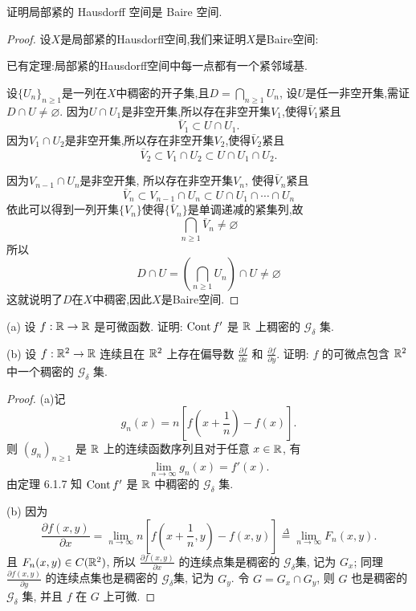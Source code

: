\begin{exercise}
    证明局部紧的 Hausdorff 空间是 Baire 空间.
\end{exercise}

\begin{proof}
  设$X$是局部紧的Hausdorff空间,我们来证明$X$是Baire空间:

  已有定理:局部紧的Hausdorff空间中每一点都有一个紧邻域基.

  设$\{U_n\}_{n\geq 1}$是一列在$X$中稠密的开子集,且$D=\bigcap_{n\geq 1}U_n$,
  设$U$是任一非空开集,需证$D\cap U\neq\varnothing$.
  因为$U\cap U_1$是非空开集,所以存在非空开集$V_1$,使得$\bar{V}_1$紧且
  \[\bar{V}_1\subset U\cap U_1.\]
  因为$V_1\cap U_2$是非空开集,所以存在非空开集$V_2$,使得$\bar{V}_2$紧且\[\bar{V}_2\subset V_1\cap U_2\subset U\cap U_1\cap U_2.\]

  因为$V_{n-1}\cap U_n$是非空开集, 所以存在非空开集$V_n$, 使得$\bar{V}_n$紧且\[\bar{V}_n\subset V_{n-1}\cap U_n\subset U\cap U_1\cap\cdots\cap U_n\]
  依此可以得到一列开集$\{V_n\}$使得$\{\bar{V}_n\}$是单调递减的紧集列,故
  \[\bigcap_{n\geq 1}\bar{V}_n\neq\varnothing\]
  所以
  \[D\cap U=\left(\bigcap_{n\geq 1}U_n\right)\cap U\neq\varnothing\]这就说明了$D$在$X$中稠密,因此$X$是Baire空间.
\end{proof}



\begin{exercise}
    (a) 设 $f:\mathbb{R}\to\mathbb{R}$ 是可微函数. 证明: $\operatorname{Cont}{f'}$ 是 $\mathbb{R}$ 上稠密的 $\mathcal{G}_{\delta}$ 集.

    (b) 设 $f:\mathbb{R}^2\to\mathbb{R}$ 连续且在 $\mathbb{R}^2$ 上存在偏导数 $\frac{\partial f}{\partial x}$ 和 $\frac{\partial f}{\partial y}$.
    证明: $f$ 的可微点包含 $\mathbb{R}^2$ 中一个稠密的 $\mathcal{G}_{\delta}$ 集.
\end{exercise}

\begin{proof}
    (a)记
    \[g_n(x)=n\left[f\left(x+\frac{1}{n}\right)-f(x)\right].\]
    则 $(g_n)_{n\geq 1}$ 是 $\mathbb{R}$ 上的连续函数序列且对于任意 $x\in\mathbb{R}$, 有
    \[\lim_{n\to\infty}g_n(x)=f'(x).\]
    由定理 6.1.7 知 $\operatorname{Cont}{f'}$ 是 $\mathbb{R}$ 中稠密的 $\mathcal{G}_{\delta}$ 集.

    (b) 因为 
    \[\frac{\partial f(x,y)}{\partial x}=\lim\limits_{n\to\infty}n\left[f\left(x+\frac{1}{n},y\right)-f(x,y)\right]\overset{\Delta}{=}\lim\limits_{n\to\infty}F_n(x,y).\]
    且 $F_n(x,y)\in C(\mathbb{R}^2)$, 所以 $\frac{\partial f(x,y)}{\partial x}$ 
    的连续点集是稠密的 $\mathcal{G}_{\delta}$集, 记为 $G_x$;
    同理 $\frac{\partial f(x,y)}{\partial y}$ 的连续点集也是稠密的 $\mathcal{G}_{\delta}$集,
    记为 $G_y$. 令 $G=G_x\cap G_y$, 则 $G$ 也是稠密的 $\mathcal{G}_{\delta}$ 集, 并且 $f$ 在 $G$ 上可微.
\end{proof}



